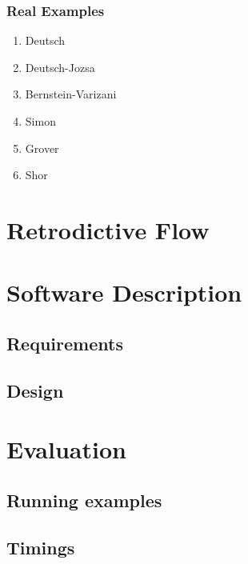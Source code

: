 \documentclass{beamer}
\newcommand{\red}[1]{{\color{red}{#1}}}
\begin{document}
\begin{frame}

\frametitle{Real Examples}

\begin{enumerate}
  \item Deutsch
  \item Deutsch-Jozsa
  \item Bernstein-Varizani
  \item Simon
  \item Grover
  \item Shor
\end{enumerate}

\pause

\vspace*{1cm}
\red{caveat: Black-Box vs White Box}

\end{frame}


\section[Retrodictive]{Retrodictive Flow}



\section[Software]{Software Description}
\subsection[Requirements]{Requirements}
\subsection[Design]{Design}


\section[Evaluation]{Evaluation}
\subsection[Running]{Running examples}
\subsection[Timings]{Timings}
\end{document}

